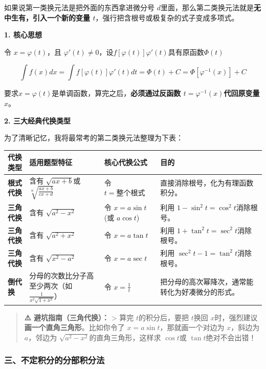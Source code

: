 \documentclass[
]{article}
\newcounter{none} %
\begin{document}
如果说第一类换元法是把外面的东西拿进微分号
\(d\)里面，那么第二类换元法就是\textbf{无中生有，引入一个新的变量
\(t\)}，强行把含根号或极复杂的式子变成多项式。

\textbf{1. 核心思想}

令 \(x = \varphi(t)\)，且
\(\varphi'(t) \neq 0\)，设\(f[\varphi(t)]\varphi'(t)\)具有原函数\(\Phi(t)\)

\[\int f(x) dx = \int f[\varphi(t)] \varphi'(t) dt=\Phi(t)+C=\Phi[\varphi^{-1}(x)]+C\]

要求\(x=\varphi(t)\)是单调函数，算完之后，\textbf{必须通过反函数
\(t = \varphi^{-1}(x)\)代回原变量 \(x\)}。

\textbf{2. 三大经典代换类型}

为了清晰记忆，我将最常考的第二类换元法整理为下表：

{\def\LTcaptype{none} %
\begin{longtable}[]{@{}llll@{}}
\toprule\noalign{}
\textbf{代换类型} & \textbf{适用题型特征} & \textbf{核心代换公式} &
\textbf{目的} \\
\midrule\noalign{}
\endhead
\bottomrule\noalign{}
\endlastfoot
\textbf{根式代换} & 含有 \(\sqrt{ax+b}\)或
\(\sqrt[n]{\frac{ax+b}{cx+d}}\) & 令 \(t = \text{整个根式}\) &
直接消除根号，化为有理函数积分。 \\
\textbf{三角代换} & 含有 \(\sqrt{a^2-x^2}\) & 令 \(x = a\sin t\)(或
\(a\cos t\)) & 利用 \(1-\sin^2 t = \cos^2 t\)消除根号。 \\
\textbf{三角代换} & 含有 \(\sqrt{a^2+x^2}\) & 令 \(x = a\tan t\) & 利用
\(1+\tan^2 t = \sec^2 t\)消除根号。 \\
\textbf{三角代换} & 含有 \(\sqrt{x^2-a^2}\) & 令 \(x = a\sec t\) & 利用
\(\sec^2 t - 1 = \tan^2 t\)消除根号。 \\
\textbf{倒代换} & 分母的次数比分子高至少两次（如
\(\frac{1}{x^2\sqrt{1+x^2}}\)） & 令 \(x = \frac{1}{t}\) &
把分母的高次幂降次，通常能转化为好凑微分的形式。 \\
\end{longtable}
}

\begin{quote}
\textbf{⚠️ 避坑指南（三角代换）：} \textgreater{} 算完
\(t\)的积分后，要把 \(t\)换回
\(x\)时，强烈建议\textbf{画一个直角三角形}。比如你令了
\(x = a\sin t\)，那就画一个对边为 \(x\)，斜边为 \(a\)，邻边为
\(\sqrt{a^2-x^2}\)的直角三角形，这样求 \(\cos t\)或
\(\tan t\)绝对不会出错！
\end{quote}

\subsubsection{三、不定积分的分部积分法}\label{ux4e09ux4e0dux5b9aux79efux5206ux7684ux5206ux90e8ux79efux5206ux6cd5}
\end{document}

